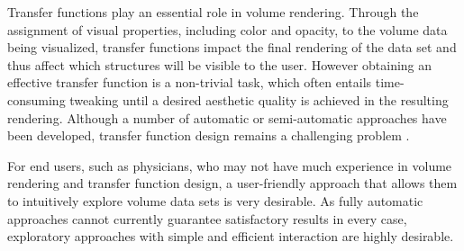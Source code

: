 Transfer functions play an essential role in volume rendering.
Through the assignment of visual properties, including color and opacity, to the volume data being visualized,
transfer functions impact the final rendering of the data set and thus affect which structures will be 
visible to the user.
However obtaining an effective transfer function is a non-trivial task, which often entails time-consuming tweaking until 
a desired aesthetic quality is achieved in the resulting rendering.
Although a number of automatic or semi-automatic approaches have been developed, 
transfer function design remains a challenging problem \cite{pfister_transfer_2001} \cite{arens_survey_2010}.

For end users, such as physicians, who may not have much experience in volume rendering and transfer function design, 
a user-friendly approach that allows them to intuitively explore volume data sets is very desirable.
As fully automatic approaches cannot currently guarantee satisfactory results in every case, 
exploratory approaches with simple and efficient interaction are highly desirable.

